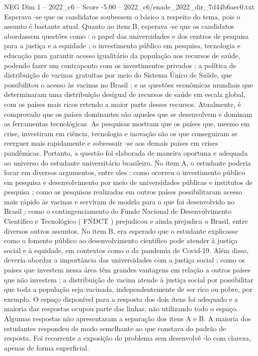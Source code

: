 \begin{textsample}{NEG Dim 1 – 2022\_c6 – Score -5.00 – 2022\_c6/enade\_2022\_dir\_7d44b6aec0.txt}
Esperava -se que os candidatos soubessem o básico a respeito do tema, pois o assunto é bastante atual.
Quanto ao item B, esperava -se que os candidatos abordassem questões como : o papel das universidades e dos centros de pesquisa para a justiça e a equidade ; o investimento público em pesquisa, tecnologia e educação para garantir acesso igualitário da população aos recursos de saúde, podendo fazer um contraponto com os investimentos privados ; a política de distribuição de vacinas gratuitas por meio do Sistema Único de Saúde, que possibilitou o acesso às vacinas no Brasil ; e as questões econômicas mundiais que determinaram uma distribuição desigual de recursos de saúde em escala global, com os países mais ricos retendo a maior parte desses recursos.
Atualmente, é comprovado que os países dominantes são aqueles que se desenvolvem e dominam as ferramentas tecnológicas.
As pesquisas mostram que os países que, mesmo em crise, investiram em ciência, tecnologia e inovação são os que conseguiram se reerguer mais rapidamente e sobressair -se aos demais países em crises pandêmicas.
Portanto, a questão foi elaborada de maneira oportuna e adequada ao universo do estudante universitário brasileiro.
No item A, o estudante poderia focar em diversos argumentos, entre eles : como ocorreu o investimento público em pesquisa e desenvolvimento por meio de universidades públicas e institutos de pesquisa ; como as pesquisas realizadas em outros países possibilitaram acesso mais rápido às vacinas e serviram de modelo para o que foi desenvolvido no Brasil ; como o contingenciamento do Fundo Nacional de Desenvolvimento Científico e Tecnológico ( FNDCT ) prejudicou e ainda prejudica o Brasil, entre diversos outros assuntos.
No item B, era esperado que o estudante explicasse como o fomento público ao desenvolvimento científico pode atender à justiça social e à equidade, em contextos como o da pandemia de Covid-19.
Além disso, deveria abordar a importância das universidades com a justiça social ; como os países que investem nessa área têm grandes vantagens em relação a outros países que não investem ; a distribuição de vacina atende à justiça social por possibilitar que toda a população seja vacinada, independentemente de ser rico ou pobre, por exemplo.
O espaço disponível para a resposta dos dois itens foi adequado e a maioria das respostas ocupou parte das linhas, não utilizando todo o espaço.
Algumas respostas não apresentaram a separação dos itens A e B.
A maioria dos estudantes respondeu de modo semelhante ao que constava do padrão de resposta.
Foi recorrente a exposição do problema sem desenvolvê -lo com clareza, apenas de forma superficial.

\end{textsample}
